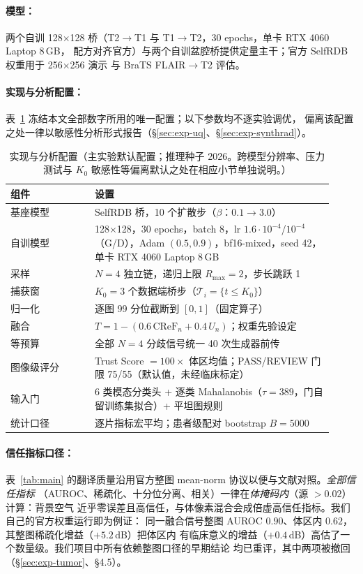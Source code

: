 \documentclass[11pt]{article}
\begin{document}
\paragraph{模型：}
两个自训 128$\times$128 桥（T2$\to$T1 与 T1$\to$T2，30 epochs，单卡 RTX 4060 Laptop 8\,GB，
配方对齐官方）与两个自训盆腔桥提供定量主干；官方 SelfRDB 权重用于 256$\times$256 演示
与 BraTS FLAIR$\to$T2 评估。
\paragraph{实现与分析配置：}
表~\ref{tab:impl} 冻结本文全部数字所用的唯一配置；以下参数均不逐实验调优，
偏离该配置之处一律以敏感性分析形式报告（\S\ref{sec:exp-uq}、\S\ref{sec:exp-synthrad}）。
\begin{table}[t]
\centering\small
\caption{实现与分析配置（主实验默认配置；推理种子 2026。跨模型分辨率、压力测试与 $K_0$ 敏感性等偏离默认之处在相应小节单独说明。）}
\label{tab:impl}
\begin{tabular}{p{0.24\linewidth}p{0.68\linewidth}}
\toprule
组件 & 设置 \\
\midrule
基座模型 & SelfRDB 桥，10 个扩散步（$\beta$：$0.1\to3.0$） \\
自训模型 & 128$\times$128，30 epochs，batch 8，lr $1.6\cdot10^{-4}$/$10^{-4}$（G/D），Adam $(0.5,0.9)$，bf16-mixed，seed 42，单卡 RTX 4060 Laptop 8\,GB \\
采样 & $N{=}4$ 独立链，递归上限 $R_{\max}{=}2$，步长跳跃 1 \\
捕获窗 & $K_0{=}3$ 个数据端桥步（$\mathcal T_i{=}\{t\le K_0\}$） \\
归一化 & 逐图 99 分位截断到 $[0,1]$（固定算子） \\
融合 & $T = 1-(0.6\,\mathrm{CReF}_n + 0.4\,U_n)$；权重先验设定 \\
等预算 & 全部 $N{=}4$ 分歧信号统一 40 次生成器前传 \\
图像级评分 & Trust Score $=100\times$ 体区均值；PASS/REVIEW 门限 75/55（默认值，未经临床标定） \\
输入门 & 6 类模态分类头 + 逐类 Mahalanobis（$\tau{=}389$，门自留训练集拟合）+ 平坦图规则 \\
统计口径 & 逐片指标宏平均；患者级配对 bootstrap $B{=}5000$ \\
\bottomrule
\end{tabular}
\end{table}
\paragraph{信任指标口径：}
表~\ref{tab:main} 的翻译质量沿用官方整图 mean-norm 协议以便与文献对照。\emph{全部信任指标}
（AUROC、稀疏化、十分位分离、相关）一律在\emph{体掩码内}（源 $>0.02$）计算：背景空气
近乎零误差且高信任，与体像素混合会成倍虚高信任指标。我们自己的官方权重运行即为例证：
同一融合信号整图 AUROC $0.90$、体区内 $0.62$，其整图稀疏化增益（$+5.2$\,dB）把体区内
有临床意义的增益（$+0.4$\,dB）高估了一个数量级。我们项目中所有依赖整图口径的早期结论
均已重评，其中两项被撤回（\S\ref{sec:exp-tumor}、\S4.5）。
\end{document}
